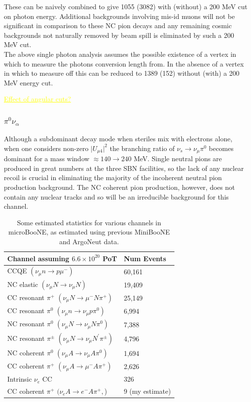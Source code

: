 \documentclass[11pt, a4paper]{article}
\newcommand{\newtext}[2]{\textcolor{#1}{\ul{#2}}}
\begin{document}
\begin{itemize}
These can be naively combined to give 1055 (3082) with (without) a 200 MeV cut on photon energy. Additional backgrounds involving mis-id muons will not be significant in comparison to these NC pion decays and any remaining cosmic backgrounds not naturally removed by beam spill is eliminated by such a 200 MeV cut.\\

The above single photon analysis assumes the possible existence of a vertex in which to measure the photons conversion length from. In the absence of a vertex in which to measure off this can be reduced to 1389 (152) without (with) a 200 MeV energy cut. 
		
\newtext{MARK}{Effect of angular cuts? }
\end{itemize}

\subsubsection{$\pi^0 \nu_\alpha$}
Although a subdominant decay mode when steriles mix with electrons alone, when one considers non-zero $\vert U_{\mu4}\vert^2$ the branching ratio of $\nu_s \rightarrow \nu_\mu \pi^0$ becomes dominant for a mass window $\approx 140 \rightarrow 240$ MeV. Single neutral pions are produced in great numbers at the three SBN facilities, so the lack of any nuclear recoil is crucial in eliminating the majority of the incoherent neutral pion production background. The NC coherent pion production, however, does not contain any nuclear tracks and so will be an irreducible background for this channel. 

\begin{table}[t]
\centering
\begin{tabular}{ l | l }
Channel  assuming $6.6\times 10^{20}$ PoT& Num Events  \\
\hline\hline
CCQE $(\nu_\mu n \rightarrow p \mu^-)$ & 60,161 \\
NC elastic $(\nu_\mu N \rightarrow \nu_\mu N)$ & 19,409  \\
CC resonant $\pi^+$ $(\nu_\mu N \rightarrow \mu^- N \pi^+)$ & 25,149  \\
CC resonant $\pi^0$ $(\nu_\mu n \rightarrow \nu_\mu p \pi^0)$ & 6,994  \\
NC resonant $\pi^0$ $(\nu_\mu N \rightarrow \nu_\mu N \pi^0)$ & 7,388  \\
NC resonant $\pi^\pm$ $(\nu_\mu N \rightarrow \nu_\mu N^\prime \pi^\pm)$ & 4,796  \\
NC coherent $\pi^0$ $(\nu_\mu A \rightarrow \nu_\mu A \pi^0)$ & 1,694 \\
CC coherent $\pi^+$ $(\nu_\mu A \rightarrow \mu^- A \pi^+)$ & 2,626 \\
\hline
Intrinsic $\nu_e$ CC & 326 \\
CC coherent $\pi^+$ $(\nu_e A \rightarrow e^- A \pi^+,$) & 9 (my estimate) \\
\end{tabular}
\caption{\label{tab:rates}Some estimated statistics for various channels in microBooNE, as estimated using previous MiniBooNE and ArgoNeut data.}
\end{table}
\end{document}
